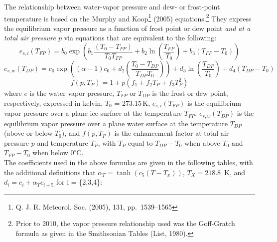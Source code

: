 \documentclass[
  english,
]{book}
\begin{document}
The relationship between water-vapor pressure and dew- or frost-point temperature is based on the Murphy and Koop\footnote{Q. J. R. Meteorol. Soc. (2005), 131, pp.~1539--1565}
(2005) equations.\footnote{Prior to 2010, the vapor pressure relationship used was the Goff-Gratch formula as given in the Smithsonian Tables (List, 1980).}
They express the equilibrium vapor pressure as a function of frost point or dew point \emph{and at a total air pressure \(p\)} via equations that are equivalent to the following:\\
\begin{equation}
e_{s,i}(T_{FP})= b_{0}^{\prime}\exp(b_{1}\frac{(T_{0}-T_{FP})}{T_{0}T_{FP}}+b_{2}\ln(\frac{T_{FP}}{T_{0}})+b_{3}(T_{FP}-T_{0}))
\label{eq:MKi}
\end{equation}
\begin{equation}
e_{s,w}(T_{DP})=c_{0}\exp\left((\alpha-1)c_{6}+d_{2}(\frac{T_{0}-T_{DP}}{T_{DP}T_{0}})\right)+d_{3}\ln(\frac{T_{DP}}{T_{0}})+d_{4}(T_{DP}-T_{0})
\label{eq:MKw}
\end{equation}
\begin{equation}
f(p, T_P)= 1 + p(f_1 + f_2T_P + f_3T_P^2)
\label{eq:enhance}
\end{equation}
where \(e\) is the water vapor pressure, \(T_{FP}\) or \(T_{DP}\) is the frost or dew point, respectively, expressed in kelvin, \(T_0\) = 273.15 K, \(e_{s,i}(T_{FP})\) is the equilibrium vapor pressure over a plane ice surface at the temperature \(T_{FP}\), \(e_{s,w}(T_{DP})\) is the equilibrium vapor pressure over a plane water surface at the temperature \(T_{DP}\) (above or below \(T_0\)), and \(f(p,T_P)\) is the enhancement factor at total air pressure \(p\) and temperature \(T_P\), with \(T_P\) equal to \(T_{DP}−T_0\) when above \(T_0\) and \(T_{FP}−T_0\) when below \(0^\circ\)C.\\
The coefficients used in the above formulas are given in the following tables, with the additional definitions that \(\alpha_T=\tanh(c_5(T-T_x))\), \(T_X=218.8\)~K, and \(d_i=c_i+\alpha_Tc_{i+5}\) for i = \{2,3,4\}:
\end{document}
